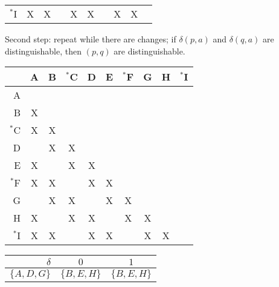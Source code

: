 \documentclass[docid=TP07]{tcom_TP}
\begin{document}
{\begin{center}
\begin{tabular}{r || c | c | c | c | c | c | c | c | c}
	$^*$I & X  & X  &    & X  & X  &    & X  & X  & \cellcolor{gray} 
\end{tabular} \end{center}
Second step: repeat while there are changes; if $\delta(p,a)$ and $\delta(q,a)$ are distinguishable, then $(p,q)$ are distinguishable.
\begin{center} \begin{tabular}{r || c | c | c | c | c | c | c | c | c}
	   & A  & B  & $^*$C & D  & E  & $^*$F & G  & H  & $^*$I \\ \hline \hline
	A  & \cellcolor{gray} & \cellcolor{gray} & \cellcolor{gray} & \cellcolor{gray} & \cellcolor{gray} & \cellcolor{gray} & \cellcolor{gray} & \cellcolor{gray} & \cellcolor{gray} \\ \hline
	B  & X  & \cellcolor{gray} & \cellcolor{gray} & \cellcolor{gray} & \cellcolor{gray} & \cellcolor{gray} & \cellcolor{gray} & \cellcolor{gray} & \cellcolor{gray} \\ \hline
	$^*$C & X  & X  & \cellcolor{gray} & \cellcolor{gray} & \cellcolor{gray} & \cellcolor{gray} & \cellcolor{gray} & \cellcolor{gray} & \cellcolor{gray} \\ \hline
	D  &    & X  & X  & \cellcolor{gray} & \cellcolor{gray} & \cellcolor{gray} & \cellcolor{gray} & \cellcolor{gray} & \cellcolor{gray} \\ \hline
	E  & X  &    & X  & X  & \cellcolor{gray} & \cellcolor{gray} & \cellcolor{gray} & \cellcolor{gray} & \cellcolor{gray} \\ \hline
	$^*$F & X  & X  &    & X  & X  & \cellcolor{gray} & \cellcolor{gray} & \cellcolor{gray} & \cellcolor{gray} \\ \hline
	G  &    & X  & X  &    & X  & X  & \cellcolor{gray} & \cellcolor{gray} & \cellcolor{gray} \\ \hline
	H  & X  &    & X  & X  &    & X  & X  & \cellcolor{gray} & \cellcolor{gray} \\ \hline
	$^*$I & X  & X  &    & X  & X  &    & X  & X  & \cellcolor{gray} 
\end{tabular} \end{center}
\begin{center}
\begin{minipage}[c]{0.45\textwidth}
\begin{center} \begin{tabular}{r | c c}
	$\delta   $ & $0        $ & $1        $ \\ \hline
	$\{A,D,G\}$ & $\{B,E,H\}$ & $\{B,E,H\}$ \\

\end{tabular}
\end{center}
\end{minipage}
\end{center}}
\end{document}
